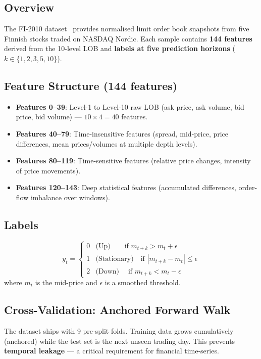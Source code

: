 \documentclass[12pt, a4paper]{article}
\begin{document}
\subsection{Overview}
The FI-2010 dataset~\cite{ntakaris2020} provides normalised limit order book snapshots from five Finnish stocks traded on NASDAQ Nordic. Each sample contains \textbf{144 features} derived from the 10-level LOB and \textbf{labels at five prediction horizons} ($k \in \{1, 2, 3, 5, 10\}$).

\subsection{Feature Structure (144 features)}
\begin{itemize}
  \item \textbf{Features 0–39}: Level-1 to Level-10 raw LOB (ask price, ask volume, bid price, bid volume) — $10 \times 4 = 40$ features.
  \item \textbf{Features 40–79}: Time-insensitive features (spread, mid-price, price differences, mean prices/volumes at multiple depth levels).
  \item \textbf{Features 80–119}: Time-sensitive features (relative price changes, intensity of price movements).
  \item \textbf{Features 120–143}: Deep statistical features (accumulated differences, order-flow imbalance over windows).
\end{itemize}

\subsection{Labels}
\[
y_t = \begin{cases}
  0 & \text{(Up)}  \quad\quad\text{if } m_{t+k} > m_t + \epsilon \\
  1 & \text{(Stationary)} \quad\text{if } |m_{t+k} - m_t| \leq \epsilon \\
  2 & \text{(Down)} \quad\;\text{if } m_{t+k} < m_t - \epsilon
\end{cases}
\]
where $m_t$ is the mid-price and $\epsilon$ is a smoothed threshold.

\subsection{Cross-Validation: Anchored Forward Walk}
The dataset ships with 9 pre-split folds. Training data grows cumulatively (anchored) while the test set is the next unseen trading day. This prevents \textbf{temporal leakage} — a critical requirement for financial time-series.
\end{document}
